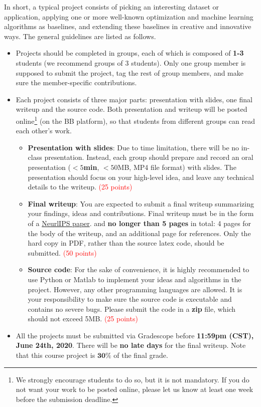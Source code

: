 \documentclass[10pt]{article}
\begin{document}
In short, a typical project consists of picking an interesting dataset or application, applying
one or more well-known optimization and machine learning algorithms as baselines, and extending
these baselines in creative and innovative ways. The general guidelines are listed as follows.
\begin{itemize}
	\item Projects should be completed in groups, each of which is composed of \textbf{1-3} students (we recommend groups of 3 students).
	      Only one group member is supposed to submit the project, tag the rest of group members,
	      and make sure the member-specific contributions.
	\item Each project consists of three major parts: presentation with slides, one final writeup and the source code.
	      Both presentation and writeup will be posted online\footnote{\footnotesize We strongly encourage students to do so, but it is not mandatory.
		      If you do not want your work to be posted online,
		      please let us know at least one week before the submission deadline.}
	      (on the BB platform), so that students from different groups
	      can read each other's work.
	      \begin{itemize}
		      \item \textbf{Presentation with slides}: Due to time limitation, there will be no in-class presentation.
		            Instead, each group should prepare and record an oral presentation (\textbf{$< 5$min}, $< 50$MB, MP4 file format) with slides.
		            The presentation should focus on your high-level idea, and leave any technical details to the writeup. \textcolor{red}{(25 points)}
		      \item \textbf{Final writeup}: You are expected to submit a final writeup summarizing your findings,
		            ideas and contributions. Final writeup must be in the form of a \href{https://neurips.cc/Conferences/2020/PaperInformation/StyleFiles}{NeurlIPS paper}.
		            and \textbf{no longer than 5 pages} in total: 4 pages for the body of the writeup, and an additional page for references.
		            Only the hard copy in PDF, rather than the source latex code, should be submitted. \textcolor{red}{(50 points)}
		      \item \textbf{Source code}: For the sake of convenience, it is highly recommended to use Python or Matlab to implement your ideas and algorithms in the project.
		            However, any other programming languages are allowed. It is your responsibility to make sure the source code is executable and contains no severe bugs.
		            Please submit the code in a \textbf{zip} file, which should not exceed 5MB.
		            \textcolor{red}{(25 points)}
	      \end{itemize}
	\item All the projects must be submitted via Gradescope before \textbf{11:59pm (CST), June 24th, 2020}.
	      There will be \textbf{no late days} for the final writeup. Note that this course project is $\mathbf{30\%}$ of the final grade.
\end{itemize}
\end{document}
